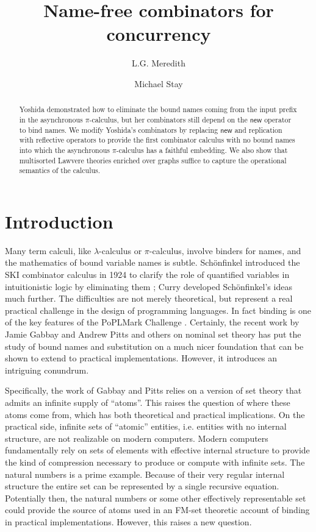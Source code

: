 \documentclass{llncs}
\title{Name-free combinators for concurrency}
\author{
L.G. Meredith\inst{1}\\
\and
Michael Stay\inst{2}\\
}
\institute{
  {RChain Cooperative}\\
  \email{\fontsize{8}{8}\selectfont greg@rchain.coop}
  \and
  {Pyrofex Corp.}\\
  \email{\fontsize{8}{8}\selectfont stay@pyrofex.net}\\
}
\newcommand{\new}{\mathsf{new}}
\newcommand{\pic}{$\pi$-calculus}
\begin{document}
\maketitle
\begin{abstract}
\noindent
  Yoshida demonstrated how to eliminate the bound names coming from
  the input prefix in the asynchronous {\pic}, but her combinators
  still depend on the $\new$ operator to bind names.
  We modify Yoshida's combinators by replacing $\new$ and replication
  with reflective operators to provide the first combinator calculus
  with no bound names into which the asynchronous {\pic} has a faithful
  embedding.  We also show that multisorted Lawvere theories enriched 
  over graphs suffice to capture the operational semantics of the calculus.
\end{abstract}

\section{Introduction}

Many term calculi, like $\lambda$-calculus or {\pic}, involve binders
for names, and the mathematics of bound variable names is
subtle. Sch\"onfinkel introduced the SKI combinator calculus in 1924
to clarify the role of quantified variables in intuitionistic logic by
eliminating them \cite{finkel}; Curry developed Sch\"onfinkel's ideas
much further. The difficulties are not merely theoretical, but
represent a real practical challenge in the design of programming
languages. In fact binding is one of the key features of
the PoPLMark Challenge \cite{PoPLMark}. Certainly, the recent work by Jamie
Gabbay and Andrew Pitts \cite{DBLP:journals/fac/GabbayP02} and others
\cite{DBLP:journals/jcss/Clouston14} on nominal set theory has put the
study of bound names and substitution on a much nicer foundation that
can be shown to extend to practical implementations. However, it
introduces an intriguing conundrum.

Specifically, the work of Gabbay and Pitts relies on a version of set
theory that admits an infinite supply of ``atoms''. This raises the
question of where these atoms come from, which has both theoretical and
practical implications. On the practical side, infinite sets of
``atomic'' entities, i.e. entities with no internal structure, are not
realizable on modern computers. Modern computers fundamentally rely on
sets of elements with effective internal structure to provide the kind
of compression necessary to produce or compute with infinite sets. The
natural numbers is a prime example. Because of their very regular
internal structure the entire set can be represented by a single
recursive equation. Potentially then, the natural numbers or some
other effectively representable set could provide the source of atoms
used in an FM-set theoretic account of binding in practical
implementations. However, this raises a new question.
\end{document}
